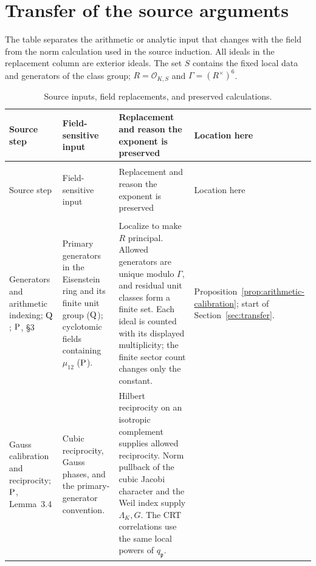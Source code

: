 \documentclass[11pt,a4paper]{article}
\numberwithin{equation}{section}
\theoremstyle{definition}
\theoremstyle{remark}
\newcommand{\Qsrc}{\textup{Q}}
\newcommand{\Psrc}{\textup{P}}
\begin{document}
\clearpage
\appendix
\section{Transfer of the source arguments}\label{app:transfer-map}

The table separates the arithmetic or analytic input that changes with
the field from the norm calculation used in the source induction.
All ideals in the replacement column are exterior ideals. The set $S$
contains the fixed local data and generators of the class group;
$R=\mathcal O_{K,S}$ and $\Gamma=(R^\times)^6$.

\begingroup
\small
\setlength{\tabcolsep}{4pt}
\renewcommand{\arraystretch}{1.15}
\begin{longtable}{@{}>{\raggedright\arraybackslash}p{}>{\raggedright\arraybackslash}p{}>{\raggedright\arraybackslash}p{}>{\raggedright\arraybackslash}p{}@{}}
\caption{Source inputs, field replacements, and preserved calculations.}
\label{tab:transfer-map}\\
\toprule
Source step & Field-sensitive input & Replacement and reason the exponent is preserved & Location here\\
\midrule
\endfirsthead
\multicolumn{4}{l}{\textit{Table \thetable\ continued}}\\
\toprule
Source step & Field-sensitive input & Replacement and reason the exponent is preserved & Location here\\
\midrule
\endhead
\midrule
\multicolumn{4}{r}{\textit{Continued on the next page}}\\
\endfoot
\bottomrule
\endlastfoot
Generators and arithmetic indexing; $\Qsrc$; $\Psrc$, \S3
& Primary generators in the Eisenstein ring and its finite unit group ($\Qsrc$); cyclotomic fields containing $\mu_{12}$ ($\Psrc$).
& Localize to make $R$ principal. Allowed generators are unique modulo
$\Gamma$, and residual unit classes form a finite set. Each ideal is
counted with its displayed multiplicity; the finite sector count changes
only the constant.
& Proposition~\ref{prop:arithmetic-calibration}; start of
Section~\ref{sec:transfer}.\\[3pt]
Gauss calibration and reciprocity; $\Psrc$, Lemma~3.4
& Cubic reciprocity, Gauss phases, and the primary-generator convention.
& Hilbert reciprocity on an isotropic complement supplies allowed
reciprocity. Norm pullback of the cubic Jacobi character and the Weil
index supply $\Lambda_K,G$. The CRT correlations use the same local
powers of $q_{\mathfrak p}$.

\end{longtable}
\end{document}

